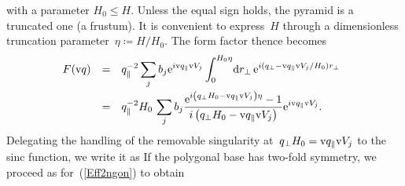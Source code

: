 with a parameter $H_0\le H$.
Unless the equal sign holds,
the pyramid is a truncated one (a frustum).
It is convenient to express~$H$ through
a dimensionless truncation parameter~$\eta\coloneqq H/H_0$.
The form factor thence becomes 
\begin{equation}
  \begin{array}{@{}lcl}
  F(\q)
  &=& \displaystyle
      q_\parallel^{-2}  \sum_j b_j \e^{i\q_\parallel \V_j}
      \int_0^{H_0\eta}\!\d r_\perp\,\e^{i(q_\perp-\q_\parallel \V_j/H_0)r_\perp}
\\[3ex]
  &=& \displaystyle
       q_\parallel^{-2} H_0\, \sum_j b_j  
          \frac{\e^{i\left(q_\perp H_0-\q_\parallel\V_j\right)\eta}-1}
               {i\left(q_\perp H_0 - \q_\parallel\V_j\right)}
               \e^{i\q_\parallel \V_j}.
  \end{array}
\end{equation}
Delegating the handling of the removable singularity at~$q_\perp H_0=\text{v}{q}_\parallel\text{v}{V}_j$
to the sinc function,
we write it as
If the polygonal base has two-fold symmetry, we proceed as for~(\ref{Eff2ngon})
to obtain

%
%
%
%

\iffalse
\section{Special functions near the removable singularity}

\index{Machine epsilon}
We assume a double-precision machine epsilon
of $\epsilon=2^{-52}\simeq2.2\cdot10^{-16}$.

\fi

